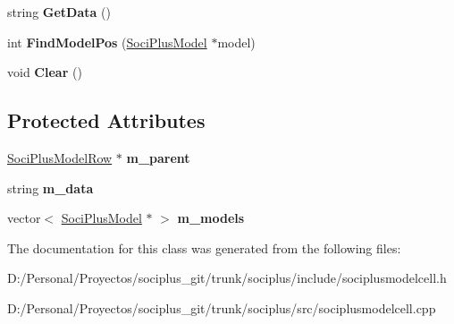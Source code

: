 \begin{DoxyCompactItemize}
\item 
\hypertarget{class_soci_plus_1_1_soci_plus_model_cell_aa347d597231cbbb053187fdf355bcf25}{string {\bfseries Get\+Data} ()}\label{class_soci_plus_1_1_soci_plus_model_cell_aa347d597231cbbb053187fdf355bcf25}

\item 
\hypertarget{class_soci_plus_1_1_soci_plus_model_cell_a6f78dc5746eb5b5a8d551e9536f76c91}{int {\bfseries Find\+Model\+Pos} (\hyperlink{class_soci_plus_1_1_soci_plus_model}{Soci\+Plus\+Model} $\ast$model)}\label{class_soci_plus_1_1_soci_plus_model_cell_a6f78dc5746eb5b5a8d551e9536f76c91}

\item 
\hypertarget{class_soci_plus_1_1_soci_plus_model_cell_a55d2a75a2d633e70188f2e5221aee8f2}{void {\bfseries Clear} ()}\label{class_soci_plus_1_1_soci_plus_model_cell_a55d2a75a2d633e70188f2e5221aee8f2}

\end{DoxyCompactItemize}
\subsection*{Protected Attributes}
\begin{DoxyCompactItemize}
\item 
\hypertarget{class_soci_plus_1_1_soci_plus_model_cell_add456f301caaf058df3cad22c4dd1ebc}{\hyperlink{class_soci_plus_1_1_soci_plus_model_row}{Soci\+Plus\+Model\+Row} $\ast$ {\bfseries m\+\_\+parent}}\label{class_soci_plus_1_1_soci_plus_model_cell_add456f301caaf058df3cad22c4dd1ebc}

\item 
\hypertarget{class_soci_plus_1_1_soci_plus_model_cell_adce43583c83cf5df6912c105985f07f9}{string {\bfseries m\+\_\+data}}\label{class_soci_plus_1_1_soci_plus_model_cell_adce43583c83cf5df6912c105985f07f9}

\item 
\hypertarget{class_soci_plus_1_1_soci_plus_model_cell_a0ad962ec0335c2dc642fec8bce9da997}{vector$<$ \hyperlink{class_soci_plus_1_1_soci_plus_model}{Soci\+Plus\+Model} $\ast$ $>$ {\bfseries m\+\_\+models}}\label{class_soci_plus_1_1_soci_plus_model_cell_a0ad962ec0335c2dc642fec8bce9da997}

\end{DoxyCompactItemize}


The documentation for this class was generated from the following files\+:\begin{DoxyCompactItemize}
\item 
D\+:/\+Personal/\+Proyectos/sociplus\+\_\+git/trunk/sociplus/include/sociplusmodelcell.\+h\item 
D\+:/\+Personal/\+Proyectos/sociplus\+\_\+git/trunk/sociplus/src/sociplusmodelcell.\+cpp\end{DoxyCompactItemize}
